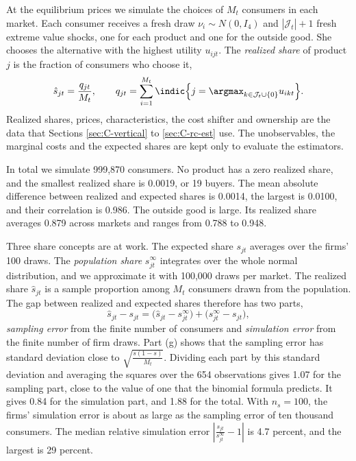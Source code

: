 At the equilibrium prices we simulate the choices of $M_t$ consumers in each market. Each consumer receives a fresh
draw $\nu_i \sim N(0, I_4)$ and $|\mathcal{J}_t| + 1$ fresh extreme value shocks, one for each product and one for the
outside good. She chooses the alternative with the highest utility $u_{ijt}$. The \emph{realized share} of product $j$
is the fraction of consumers who choose it,
\begin{equation}\label{eq:C-realized}
  \hat s_{jt} = \frac{q_{jt}}{M_t} , \qquad q_{jt} = \sum_{i=1}^{M_t}\indic\Big\{j = \argmax_{k \in \mathcal{J}_t \cup \{0\}}u_{ikt}\Big\} .
\end{equation}
Realized shares, prices, characteristics, the cost shifter and ownership are the data that Sections
\ref{sec:C-vertical} to \ref{sec:C-rc-est} use. The unobservables, the marginal costs and the expected shares are
kept only to evaluate the estimators.

In total we simulate 999,870 consumers. No product has a zero realized share, and the smallest realized share is
0.0019, or 19 buyers. The mean absolute difference between realized and expected shares is 0.0014, the largest is
0.0100, and their correlation is 0.986. The outside good is large. Its realized share averages 0.879 across markets
and ranges from 0.788 to 0.948.

Three share concepts are at work. The expected share $s_{jt}$ averages over the firms' 100 draws. The
\emph{population share} $s^\infty_{jt}$ integrates over the whole normal distribution, and we approximate it with
100,000 draws per market. The realized share $\hat s_{jt}$ is a sample proportion among $M_t$ consumers drawn from the
population. The gap between realized and expected shares therefore has two parts,
\begin{equation*}
  \hat s_{jt} - s_{jt} = \big(\hat s_{jt} - s^\infty_{jt}\big) + \big(s^\infty_{jt} - s_{jt}\big) ,
\end{equation*}
\emph{sampling error} from the finite number of consumers and \emph{simulation error} from the finite number of firm
draws. Part (g) shows that the sampling error has standard deviation close to $\sqrt{\frac{s(1 - s)}{M_t}}$. Dividing
each part by this standard deviation and averaging the squares over the 654 observations gives 1.07 for the sampling
part, close to the value of one that the binomial formula predicts. It gives 0.84 for the simulation part, and 1.88
for the total. With $n_s = 100$, the firms' simulation error is about as large as the sampling error of
ten thousand consumers. The median relative simulation error $|\frac{s_{jt}}{s^\infty_{jt}} - 1|$ is 4.7 percent, and
the largest is 29 percent.

